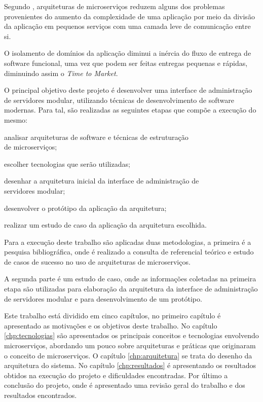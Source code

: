 Segundo , arquiteturas de microserviços reduzem
alguns dos problemas provenientes do aumento da complexidade de uma aplicação
por meio da divisão da aplicação em pequenos serviços com uma camada leve
de comunicação entre si.

O isolamento de domínios da aplicação diminui a inércia do fluxo de entrega
de software funcional, uma vez que podem ser feitas entregas pequenas e
rápidas, diminuindo assim o \emph{Time to Market}.

O principal objetivo deste projeto é desenvolver uma interface de
administração de servidores modular, utilizando técnicas de desenvolvimento
de software modernas. Para tal, são realizadas as seguintes etapas que compõe
a execução do mesmo:

\begin{alineas}
  \item analisar arquiteturas de software e técnicas de estruturação \\
    de microserviços;
  \item escolher tecnologias que serão utilizadas;
  \item desenhar a arquitetura inicial da interface de administração de \\
    servidores modular;
  \item desenvolver o protótipo da aplicação da arquitetura;
  \item realizar um estudo de caso da aplicação da arquitetura escolhida.
\end{alineas}

Para a execução deste trabalho são aplicadas duas metodologias, a primeira
é a pesquisa bibliográfica, onde é realizado a consulta de referencial
teórico e estudo de casos de sucesso no uso de arquiteturas de microserviços.

A segunda parte é um estudo de caso, onde as informações coletadas
na primeira etapa são utilizadas para elaboração da arquitetura da interface
de administração de servidores modular e para desenvolvimento de um protótipo.

Este trabalho está dividido em cinco capítulos, no primeiro capítulo é
apresentado as motivações e os objetivos deste trabalho. No capítulo
\ref{chp:tecnologias} são apresentados os principais conceitos e tecnologias
envolvendo microserviços, abordando um pouco sobre arquiteturas
e práticas que originaram o conceito de microserviços. O capítulo
\ref{chp:arquitetura} se trata do desenho da arquitetura do sistema. No
capítulo \ref{chp:resultados} é apresentando os resultados obtidos na execução
do projeto e dificuldades encontradas. Por último a conclusão do projeto,
onde é apresentado uma revisão geral do trabalho e dos resultados encontrados.
